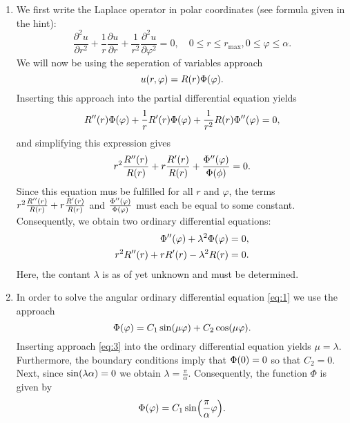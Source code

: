 \documentclass[english]{exercise}
\begin{document}
	\begin{enumerate}
		\item We first write the Laplace operator in polar coordinates (see formula given in the hint):
		\[
			\frac{\partial^2 u}{\partial r^2} + \frac{1}{r}\frac{\partial u}{\partial r} + \frac{1}{r^2}\frac{\partial^2 u}{\partial\varphi^2} = 0, \quad 0 \le r \le r_{\text{max}}, 0 \le \varphi \le \alpha.
		\]
		We will now be using the seperation of variables approach
		\[
			u\parentheses*{r, \varphi} = R\parentheses*{r}\Phi\parentheses*{\varphi}.
		\]
		Inserting this approach into the partial differential equation yields
		\[
			R''\parentheses*{r}\Phi\parentheses*{\varphi} + \frac{1}{r}R'\parentheses*{r}\Phi\parentheses*{\varphi} + \frac{1}{r^2}R\parentheses*{r}\Phi''\parentheses*{\varphi} = 0,
		\]
		and simplifying this expression gives
		\[
			r^2 \frac{R''\parentheses*{r}}{R\parentheses*{r}} + r\frac{R'\parentheses*{r}}{R\parentheses*{r}} + \frac{\Phi''\parentheses*{\varphi}}{\Phi\parentheses*{\phi}} = 0.
		\]
		Since this equation mus be fulfilled for all \(r\) and \(\varphi\), the terms \(r^2 \frac{R''\parentheses*{r}}{R\parentheses*{r}} + r\frac{R'\parentheses*{r}}{R\parentheses*{r}}\) and \(\frac{\Phi''\parentheses*{\varphi}}{\Phi\parentheses*{\varphi}}\) must each be equal to some constant.
		Consequently, we obtain two ordinary differential equations:
		\begin{align}
			\Phi''\parentheses*{\varphi} + \lambda^2 \Phi\parentheses*{\varphi} &= 0, \label{eq:1}\\
			r^2 R''\parentheses*{r} + r R'\parentheses*{r} - \lambda^2 R\parentheses*{r} &= 0. \label{eq:2}
		\end{align}
		Here, the contant \(\lambda\) is as of yet unknown and must be determined.
		\item In order to solve the angular ordinary differential equation \eqref{eq:1} we use the approach
		\begin{equation}\label{eq:3}
			\Phi\parentheses*{\varphi} = C_1 \sin\parentheses*{\mu\varphi} + C_2 \cos\parentheses*{\mu\varphi}.
		\end{equation}
		Inserting approach \eqref{eq:3} into the ordinary differential equation yields \(\mu = \lambda\).
		Furthermore, the boundary conditions imply that \(\Phi\parentheses*{0} = 0\) so that \(C_2 = 0\).
		Next, since \(\sin\parentheses*{\lambda\alpha} = 0\) we obtain \(\lambda = \frac{\pi}{\alpha}\).
		Consequently, the function \(\Phi\) is given by
		\[
			\Phi\parentheses*{\varphi} = C_1 \sin\parentheses*{\frac{\pi}{\alpha}\varphi}.
\]
\end{enumerate}
\end{document}
